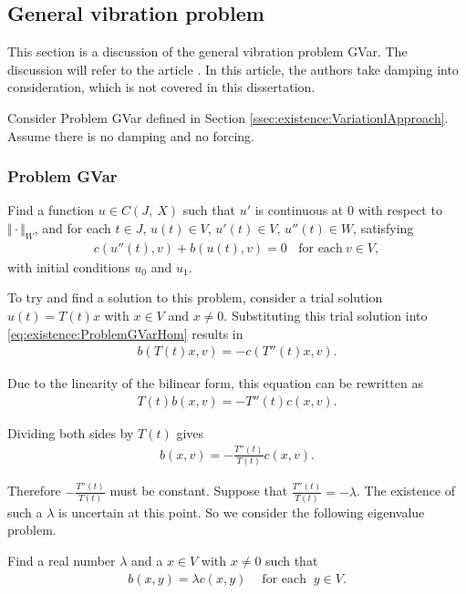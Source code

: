 \documentclass[../../main.tex]{subfiles}
\begin{document}
\subsection{General vibration problem}
This section is a discussion of the general vibration problem GVar. The discussion will refer to the article \cite{CVV18}. In this article, the authors take damping into consideration, which is not covered in this dissertation. 

Consider Problem GVar defined in Section \ref{ssec:existence:VariationlApproach}. Assume there is no damping and no forcing. 

\subsubsection*{Problem GVar}\label{sssec:existence:ProblemGVar}
Find a function $u \in C(J,\ X)$ such that $u'$ is continuous at $0$ with respect to $\Vert \cdot \Vert_{W}$, and for each $t \in J$, $u(t) \in V$, $u'(t) \in V$, $u''(t) \in W$, satisfying
\begin{eqnarray}
c(u''(t),v)+b(u(t),v) = 0 \ \ \ \ \textrm{for each} \ v \in V, \label{eq:existence:ProblemGVarHom}
\end{eqnarray}
with initial conditions $u_{0}$ and $u_{1}$.

To try and find a solution to this problem, consider a trial solution $u(t) = T(t)x$ with $x \in V$ and $x \neq 0$. Substituting this trial solution into \eqref{eq:existence:ProblemGVarHom} results in
\begin{eqnarray*}
	b(T(t)x,v) = - c(T''(t)x,v).  \label{eq:existence:ProblemGVarHom:Substitution}
\end{eqnarray*}

Due to the linearity of the bilinear form, this equation can be rewritten as
\begin{eqnarray*}
	T(t)b(x,v) = - T''(t)c(x,v).
\end{eqnarray*}

Dividing both sides by $T(t)$ gives
\begin{eqnarray*}
	b(x,v) = - \frac{T''(t)}{T(t)}c(x,v).
\end{eqnarray*}

Therefore $\displaystyle -\frac{T''(t)}{T(t)}$ must be constant. Suppose that $\displaystyle \frac{T''(t)}{T(t)} = -\lambda$. The existence of such a $\lambda$ is uncertain at this point. So we consider the following eigenvalue problem.

Find a real number $\lambda$ and a $x \in V$ with $x \neq 0$ such that
\begin{eqnarray*}
	b(x,y) = \lambda c(x,y) \ \ \ \ \textrm{ for each } \ y \in V.
\end{eqnarray*}
\end{document}
